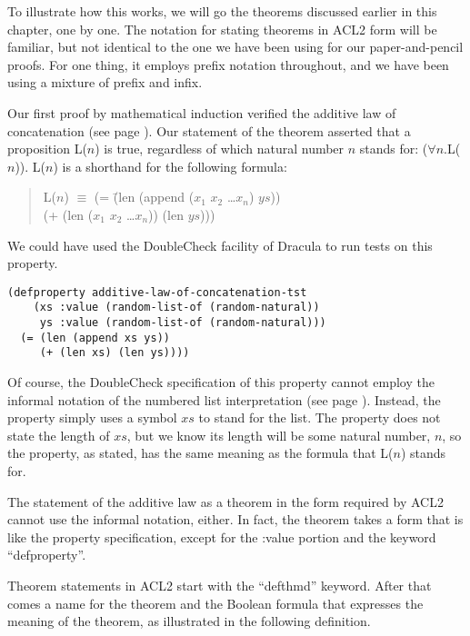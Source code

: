 To illustrate how this works, we will go the theorems discussed earlier in this chapter, one by one. The notation for stating theorems in ACL2 form will be familiar, but not identical to the one we have been using for our paper-and-pencil proofs. For one thing, it employs prefix notation throughout, and we have been using a mixture of prefix and infix.

Our first proof by mathematical induction verified the additive law of concatenation (see page \pageref{additive-law-concatenation}). Our statement of the theorem asserted that a proposition L($n$) is true, regardless of which natural number $n$ stands for: ($\forall$$n$.L($n$)). L($n$) is a shorthand for the following formula:
\begin{quote}
\begin{tabbing}
L($n$) $\equiv$ (= \=(len (append ($x_1$ $x_2$ \dots $x_n$) $ys$))  \\
                   \>(+ (len ($x_1$ $x_2$ \dots $x_n$)) (len $ys$)))
\end{tabbing}
\end{quote}

We could have used the DoubleCheck facility of Dracula to run tests on this property.

\begin{lstlisting}
(defproperty additive-law-of-concatenation-tst
    (xs :value (random-list-of (random-natural))
     ys :value (random-list-of (random-natural)))
  (= (len (append xs ys))
     (+ (len xs) (len ys))))
\end{lstlisting}

Of course, the DoubleCheck specification of this property cannot employ the informal notation of the numbered list interpretation (see page \pageref{numbered-list-interpretation}). Instead, the property simply uses a symbol $xs$ to stand for the list. The property does not state the length of $xs$, but we know its length will be some natural number, $n$, so the property, as stated, has the same meaning as the formula that L($n$) stands for.

The statement of the additive law as a theorem in the form required by ACL2 cannot use the informal notation, either. In fact, the theorem takes a form that is like the property specification, except for the :value portion and the keyword ``defproperty''.

Theorem statements in ACL2 start with the ``defthmd'' keyword. After that comes a name for the theorem and the Boolean formula that expresses the meaning of the theorem, as illustrated in the following definition.

